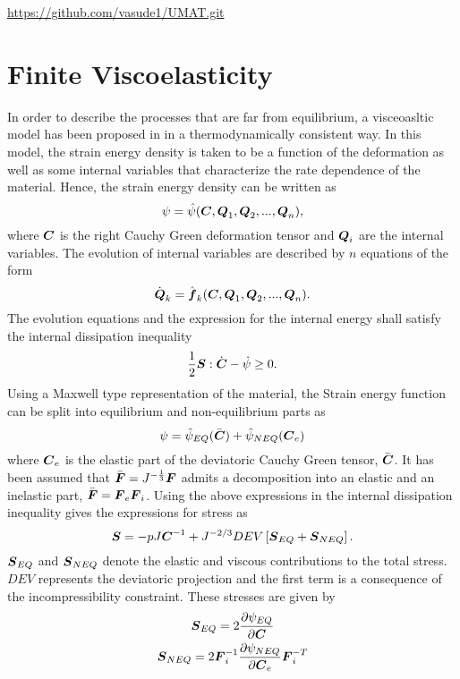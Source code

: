 \documentclass[11pt,a4paper]{article}
\author{Vasudevan }
\newcommand{\parder}[2]{{\dfrac{\partial #1}{\partial #2}}}
\begin{document}
\href{https://github.com/vasude1/UMAT.git}{https://github.com/vasude1/UMAT.git}
\section{Finite Viscoelasticity}
In order to describe the processes that are far from equilibrium, a visceoasltic model has been proposed in \cite{Bergstrom1998, Reese1998} in a thermodynamically consistent way. In this model, the strain energy density is taken to be a function of the deformation as well as some internal variables that characterize the rate dependence of the material. Hence, the strain energy density can be written as 
\begin{equation}
\psi = \hat{\psi}(\mbox{\boldmath $C$},\mbox{\boldmath $Q$}_1,\mbox{\boldmath $Q$}_2,...,\mbox{\boldmath $Q$}_n),
\end{equation}
where $\mbox{\boldmath $C$}$ is the right Cauchy Green deformation tensor and $\mbox{\boldmath $Q$}_i$ are the internal variables. The evolution of internal variables are described by $n$ equations of the form
\begin{equation}
\dot{\mbox{\boldmath $Q$}}_k = \hat{\mbox{\boldmath $f$}}_k(\mbox{\boldmath $C$},\mbox{\boldmath $Q$}_1,\mbox{\boldmath $Q$}_2,...,\mbox{\boldmath $Q$}_n).
\end{equation}
The evolution equations and the expression for the internal energy shall satisfy the internal dissipation inequality 
\begin{equation}
\frac{1}{2}\mbox{\boldmath $S$}:\dot{\mbox{\boldmath $C$}} - \dot{\psi} \geq 0.
\end{equation}
Using a Maxwell type representation of the material, the Strain energy function can be split into equilibrium and non-equilibrium parts as
\begin{equation}
\psi = \hat{\psi}_{EQ} (\bar{\mbox{\boldmath $C$}}) + \hat{\psi}_{NEQ}(\mbox{\boldmath $C$}_e)
\end{equation}
where $\mbox{\boldmath $C$}_e$ is the elastic part of the deviatoric Cauchy Green tensor, $\bar{\mbox{\boldmath $C$}}$. It has been assumed that $\bar{\mbox{\boldmath $F$}} = J^{-\frac{1}{3}} \mbox{\boldmath $F$}$ admits a decomposition into an elastic and an inelastic part, $\bar{\mbox{\boldmath $F$}} = \mbox{\boldmath $F$}_e \mbox{\boldmath $F$}_i$.
Using the above expressions in the internal dissipation inequality gives the expressions for stress as 
\begin{equation}
\mbox{\boldmath $S$} = -pJ\mbox{\boldmath $C$}^{-1} + J^{-2/3}DEV\left[\mbox{\boldmath $S$}_{EQ} + \mbox{\boldmath $S$}_{NEQ} \right].
\end{equation}
$\mbox{\boldmath $S$}_{EQ}$ and $\mbox{\boldmath $S$}_{NEQ}$ denote the elastic and viscous contributions to the total stress. $DEV$ represents the deviatoric projection and the first term is a consequence of the incompressibility constraint. These stresses are given by  
\begin{gather}
\bfS_{EQ} = 2\parder{\psi_{EQ}}{\bfC} \\
\bfS_{NEQ} = 2 \bfF_i^{-1} \parder{\psi_{NEQ}}{\bfC_e}\bfF_i^{-T}
\end{gather}
\end{document}
